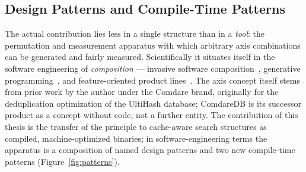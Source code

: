 \begin{nurkurz}
\subsection{Design Patterns and Compile-Time Patterns}\label{sec:anatomy-patterns}
The actual contribution lies less in a single structure than in a \emph{tool}: the permutation and
measurement apparatus with which arbitrary axis combinations can be generated and fairly measured.
Scientifically it situates itself in the software engineering of \emph{composition} --- invasive software
composition~\cite{assmann2003invasive}, generative programming~\cite{czarnecki2000generative}, and
feature-oriented product lines~\cite{apel2013feature,batory1992hierarchical}. The axis concept itself
stems from prior work by the author under the Comdare brand, originally for the deduplication
optimization of the UltiHash database; ComdareDB is its successor product as a concept without code, not
a further entity. The contribution of this thesis is the transfer of the principle to cache-aware search
structures as compiled, machine-optimized binaries; in software-engineering terms the apparatus is a
composition of named design patterns and two new compile-time patterns (Figure~\ref{fig:patterns}).
\begin{figure}[htbp]\centering
{}
\end{figure}
\end{nurkurz}
